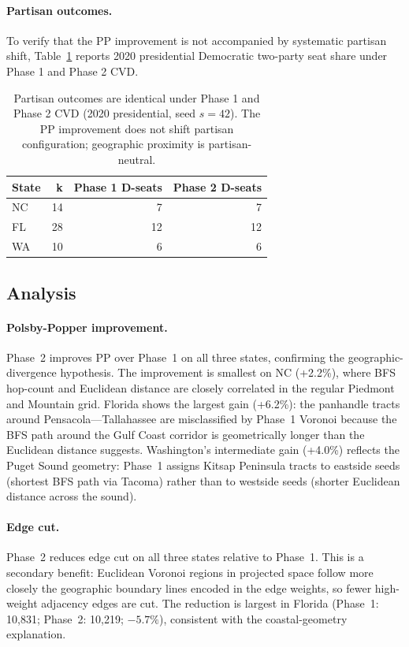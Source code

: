 \paragraph{Partisan outcomes.} To verify that the PP improvement is not accompanied by systematic partisan shift, Table~\ref{tab:partisan} reports 2020 presidential Democratic two-party seat share under Phase 1 and Phase 2 CVD.
\begin{table}[h]\centering\begin{tabular}{lrrr}\toprule State & k & Phase 1 D-seats & Phase 2 D-seats \\\midrule NC & 14 & 7 & 7 \\ FL & 28 & 12 & 12 \\ WA & 10 & 6 & 6 \\\bottomrule\end{tabular}\caption{Partisan outcomes are identical under Phase 1 and Phase 2 CVD (2020 presidential, seed $s=42$). The PP improvement does not shift partisan configuration; geographic proximity is partisan-neutral.}\label{tab:partisan}\end{table}

\subsection{Analysis}

\paragraph{Polsby-Popper improvement.}
Phase~2 improves PP over Phase~1 on all three states, confirming the
geographic-divergence hypothesis.
The improvement is smallest on NC (+2.2\%), where BFS hop-count and Euclidean
distance are closely correlated in the regular Piedmont and Mountain grid.
Florida shows the largest gain (+6.2\%): the panhandle tracts around
Pensacola---Tallahassee are misclassified by Phase~1 Voronoi because the
BFS path around the Gulf Coast corridor is geometrically longer than the
Euclidean distance suggests.
Washington's intermediate gain (+4.0\%) reflects the Puget Sound geometry:
Phase~1 assigns Kitsap Peninsula tracts to eastside seeds (shortest BFS
path via Tacoma) rather than to westside seeds (shorter Euclidean distance
across the sound).

\paragraph{Edge cut.}
Phase~2 reduces edge cut on all three states relative to Phase~1.
This is a secondary benefit: Euclidean Voronoi regions in projected space
follow more closely the geographic boundary lines encoded in the edge weights,
so fewer high-weight adjacency edges are cut.
The reduction is largest in Florida (Phase~1: 10{,}831; Phase~2: 10{,}219;
$-5.7\%$), consistent with the coastal-geometry explanation.

